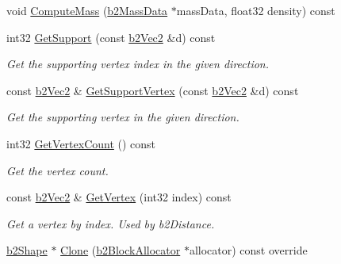 \begin{DoxyCompactItemize}
\item 
void \hyperlink{classb2CircleShape_a5f2e516df3f347a51017bca2bd0e5aab}{Compute\+Mass} (\hyperlink{structb2MassData}{b2\+Mass\+Data} $\ast$mass\+Data, float32 density) const
\item 
\mbox{\label{classb2CircleShape_ab2f645ce97d3e9fbde8332858374930e}} 
int32 \hyperlink{classb2CircleShape_ab2f645ce97d3e9fbde8332858374930e}{Get\+Support} (const \hyperlink{structb2Vec2}{b2\+Vec2} \&d) const
\begin{DoxyCompactList}\small\item\em Get the supporting vertex index in the given direction. \end{DoxyCompactList}\item 
\mbox{\label{classb2CircleShape_a1bbdbe4a38b6bdd186f8a89cb946fd6d}} 
const \hyperlink{structb2Vec2}{b2\+Vec2} \& \hyperlink{classb2CircleShape_a1bbdbe4a38b6bdd186f8a89cb946fd6d}{Get\+Support\+Vertex} (const \hyperlink{structb2Vec2}{b2\+Vec2} \&d) const
\begin{DoxyCompactList}\small\item\em Get the supporting vertex in the given direction. \end{DoxyCompactList}\item 
\mbox{\label{classb2CircleShape_a438544cc4495a13acd20aea3f964720a}} 
int32 \hyperlink{classb2CircleShape_a438544cc4495a13acd20aea3f964720a}{Get\+Vertex\+Count} () const
\begin{DoxyCompactList}\small\item\em Get the vertex count. \end{DoxyCompactList}\item 
\mbox{\label{classb2CircleShape_a5ec939d9fe54ede65032f32f7f692695}} 
const \hyperlink{structb2Vec2}{b2\+Vec2} \& \hyperlink{classb2CircleShape_a5ec939d9fe54ede65032f32f7f692695}{Get\+Vertex} (int32 index) const
\begin{DoxyCompactList}\small\item\em Get a vertex by index. Used by b2\+Distance. \end{DoxyCompactList}\item 
\mbox{\label{classb2CircleShape_a0910bc7335923aa4c525be26dfd6e720}} 
\hyperlink{classb2Shape}{b2\+Shape} $\ast$ \hyperlink{classb2CircleShape_a0910bc7335923aa4c525be26dfd6e720}{Clone} (\hyperlink{classb2BlockAllocator}{b2\+Block\+Allocator} $\ast$allocator) const override

\end{DoxyCompactItemize}
